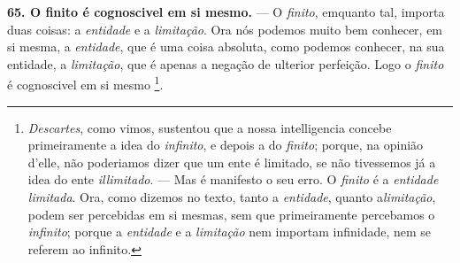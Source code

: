  \textbf{65. O finito é cognoscivel em si mesmo.} --- O \emph{finito}, emquanto tal, importa duas coisas: a \emph{entidade} e a \emph{limitação}. Ora nós podemos muito bem conhecer, em si mesma, a \emph{entidade}, que é uma coisa absoluta, como podemos conhecer, na sua entidade, a \emph{limitação}, que é apenas a negação de ulterior perfeição. Logo o \emph{finito} é cognoscivel em si mesmo \footnote{\emph{Descartes}, como vimos, sustentou que a nossa intelligencia concebe primeiramente a idea do \emph{infinito}, e depois a do \emph{finito}; porque, na opinião d'elle, não poderiamos dizer que um ente é limitado, se não tivessemos já a idea do ente \emph{illimitado}. --- Mas é manifesto o seu erro. O \emph{finito} é a \emph{entidade limitada}. Ora, como dizemos no texto, tanto a \emph{entidade}, quanto a\emph{limitação}, podem ser percebidas em si mesmas, sem que primeiramente percebamos o \emph{infinito}; porque a \emph{entidade} e a \emph{limitação} nem importam infinidade, nem se referem ao infinito.}.
